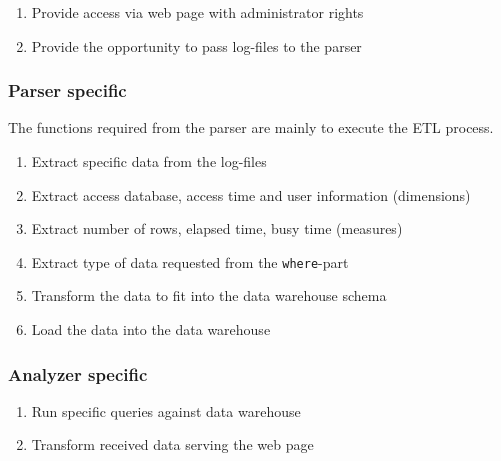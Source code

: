 \begin{enumerate}[resume*=func]
  
  \item Provide access via web page with administrator rights\label{f15}
   
  \item Provide the opportunity to pass log-files to the parser\label{f16}
   
\end{enumerate}


\subsubsection*{Parser specific}
 The functions required from the parser are mainly to execute the ETL process. 
 
\begin{enumerate}[resume*=func]
  
  \item Extract specific data from the log-files \label{p1}
  
  \item Extract access database, access time and user information (dimensions)\label{p2} %
  
  \item Extract number of rows, elapsed time, busy time (measures)\label{f17} %
  
  \item Extract type of data requested from the \texttt{where}-part\label{p4} %
  
  \item Transform the data to fit into the data warehouse schema\label{f18}
  
  \item Load the data into the data warehouse\label{f19}

\end{enumerate}

\subsubsection*{Analyzer specific}
 
\begin{enumerate}[resume*=func]
  
  \item Run specific queries against data warehouse \label{f20}
  
  \item Transform received data serving the web page \label{f21}

\end{enumerate}


